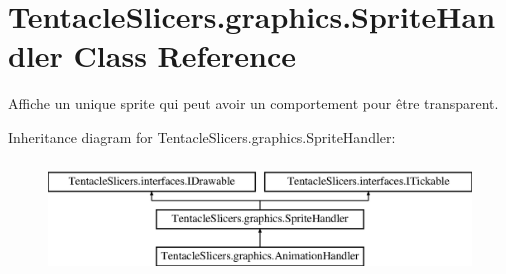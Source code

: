 \hypertarget{class_tentacle_slicers_1_1graphics_1_1_sprite_handler}{}\section{Tentacle\+Slicers.\+graphics.\+Sprite\+Handler Class Reference}
\label{class_tentacle_slicers_1_1graphics_1_1_sprite_handler}


Affiche un unique sprite qui peut avoir un comportement pour être transparent.  


Inheritance diagram for Tentacle\+Slicers.\+graphics.\+Sprite\+Handler\+:\begin{figure}[H]
\begin{center}
\leavevmode
\includegraphics[height=3.000000cm]{class_tentacle_slicers_1_1graphics_1_1_sprite_handler}
\end{center}
\end{figure}
